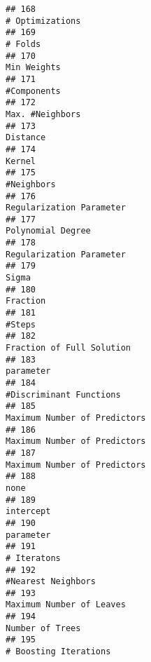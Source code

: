 \documentclass[
]{article}
\begin{document}
\begin{verbatim}
## 168                                                                         # Optimizations
## 169                                                                                 # Folds
## 170                                                                             Min Weights
## 171                                                                             #Components
## 172                                                                         Max. #Neighbors
## 173                                                                                Distance
## 174                                                                                  Kernel
## 175                                                                              #Neighbors
## 176                                                                Regularization Parameter
## 177                                                                       Polynomial Degree
## 178                                                                Regularization Parameter
## 179                                                                                   Sigma
## 180                                                                                Fraction
## 181                                                                                  #Steps
## 182                                                               Fraction of Full Solution
## 183                                                                               parameter
## 184                                                                 #Discriminant Functions
## 185                                                            Maximum Number of Predictors
## 186                                                            Maximum Number of Predictors
## 187                                                            Maximum Number of Predictors
## 188                                                                                    none
## 189                                                                               intercept
## 190                                                                               parameter
## 191                                                                             # Iteratons
## 192                                                                      #Nearest Neighbors
## 193                                                                Maximum Number of Leaves
## 194                                                                         Number of Trees
## 195                                                                   # Boosting Iterations

\end{verbatim}
\end{document}
